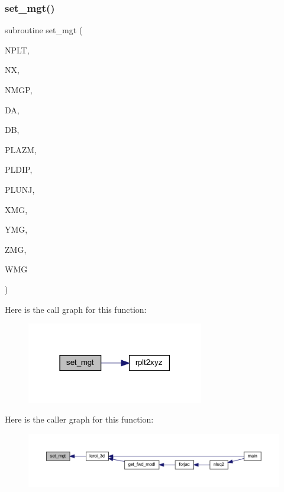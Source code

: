 \subsubsection{\texorpdfstring{set\+\_\+mgt()}{set\_mgt()}}
{\footnotesize\ttfamily subroutine set\+\_\+mgt (\begin{DoxyParamCaption}\item[{integer}]{N\+P\+LT,  }\item[{integer}]{NX,  }\item[{integer}]{N\+M\+GP,  }\item[{real, dimension(nplt)}]{DA,  }\item[{real, dimension(nplt)}]{DB,  }\item[{real, dimension(nplt)}]{P\+L\+A\+ZM,  }\item[{real, dimension(nplt)}]{P\+L\+D\+IP,  }\item[{real, dimension(nplt)}]{P\+L\+U\+NJ,  }\item[{real, dimension (nmgp,nplt)}]{X\+MG,  }\item[{real, dimension (nmgp,nplt)}]{Y\+MG,  }\item[{real, dimension (nmgp,nplt)}]{Z\+MG,  }\item[{real, dimension(nplt)}]{W\+MG }\end{DoxyParamCaption})}

Here is the call graph for this function\+:\nopagebreak
\begin{figure}[H]
\begin{center}
\leavevmode
\includegraphics[width=219pt]{Leroi_8f90_a820f6bd31435032872330d97a6fdf404_cgraph}
\end{center}
\end{figure}
Here is the caller graph for this function\+:\nopagebreak
\begin{figure}[H]
\begin{center}
\leavevmode
\includegraphics[width=350pt]{Leroi_8f90_a820f6bd31435032872330d97a6fdf404_icgraph}
\end{center}
\end{figure}
\mbox{\label{Leroi_8f90_a5e91ef1c525aed4231141372759cca43}} 
